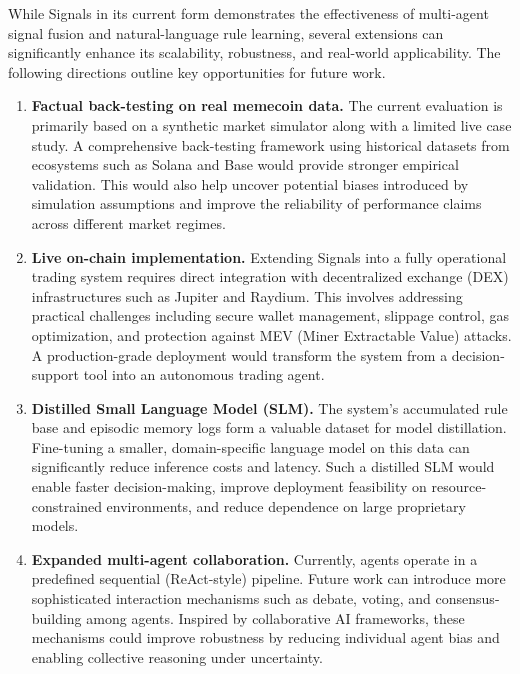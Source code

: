 \documentclass[12pt,a4paper,oneside,openany]{book}
\begin{document}
\begin{itemize}[leftmargin=8mm]
While Signals in its current form demonstrates the effectiveness of multi-agent signal fusion and natural-language rule learning, several extensions can significantly enhance its scalability, robustness, and real-world applicability. The following directions outline key opportunities for future work.

\begin{enumerate}[leftmargin=12mm]

\item \textbf{Factual back-testing on real memecoin data.}  
The current evaluation is primarily based on a synthetic market simulator along with a limited live case study. A comprehensive back-testing framework using historical datasets from ecosystems such as Solana and Base would provide stronger empirical validation. This would also help uncover potential biases introduced by simulation assumptions and improve the reliability of performance claims across different market regimes.

\item \textbf{Live on-chain implementation.}  
Extending Signals into a fully operational trading system requires direct integration with decentralized exchange (DEX) infrastructures such as Jupiter and Raydium. This involves addressing practical challenges including secure wallet management, slippage control, gas optimization, and protection against MEV (Miner Extractable Value) attacks. A production-grade deployment would transform the system from a decision-support tool into an autonomous trading agent.

\item \textbf{Distilled Small Language Model (SLM).}  
The system’s accumulated rule base and episodic memory logs form a valuable dataset for model distillation. Fine-tuning a smaller, domain-specific language model on this data can significantly reduce inference costs and latency. Such a distilled SLM would enable faster decision-making, improve deployment feasibility on resource-constrained environments, and reduce dependence on large proprietary models.

\item \textbf{Expanded multi-agent collaboration.}  
Currently, agents operate in a predefined sequential (ReAct-style) pipeline. Future work can introduce more sophisticated interaction mechanisms such as debate, voting, and consensus-building among agents. Inspired by collaborative AI frameworks, these mechanisms could improve robustness by reducing individual agent bias and enabling collective reasoning under uncertainty.


\end{enumerate}
\end{itemize}
\end{document}
